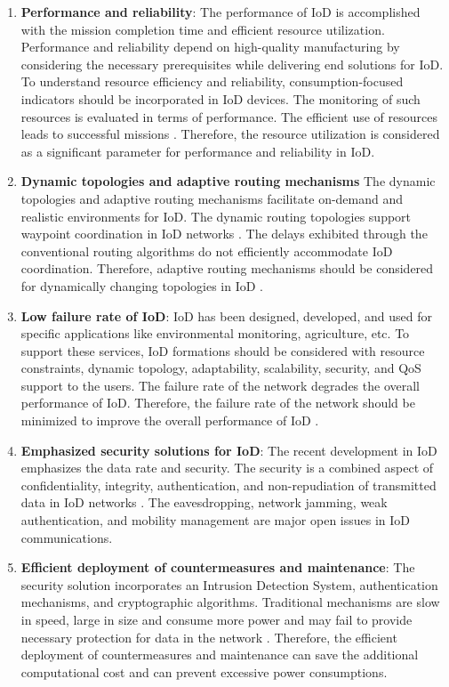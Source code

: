 \documentclass{easychair}
\begin{document}
\begin{enumerate}
\item  \textbf{Performance and reliability}: The performance of IoD is accomplished with the mission completion time and efficient resource utilization.  Performance and reliability depend on high-quality manufacturing by considering the necessary prerequisites while delivering end solutions for IoD. To understand resource efficiency and reliability, consumption-focused indicators should be incorporated in IoD devices. The monitoring of such resources is evaluated in terms of performance. The efficient use of resources leads to successful missions \cite{li2017optimal}. Therefore, the resource utilization is considered as a significant parameter for performance and reliability in IoD.

\item  \textbf{Dynamic topologies and adaptive routing mechanisms} The dynamic topologies and adaptive routing mechanisms facilitate on-demand and realistic environments for IoD. The dynamic routing topologies support waypoint coordination in IoD networks \cite{sharma2018offrp}. The delays exhibited through the conventional routing algorithms do not efficiently accommodate IoD coordination. Therefore, adaptive routing mechanisms should be considered for dynamically changing topologies in IoD \cite{wu2018joint}.

\item  \textbf{Low failure rate of IoD}: IoD has been designed, developed, and used for specific applications like environmental monitoring, agriculture, etc. To support these services, IoD formations should be considered with resource constraints, dynamic topology, adaptability, scalability, security, and QoS support to the users. The failure rate of the network degrades the overall performance of IoD. Therefore, the failure rate of the network should be minimized to improve the overall performance of IoD \cite{sharma2015self}.

 \item  \textbf{Emphasized security solutions for IoD}: The recent development in IoD emphasizes the data rate and security. The security is a combined aspect of confidentiality, integrity, authentication, and non-repudiation of transmitted data in IoD networks \cite{haque2018new}. The eavesdropping, network jamming, weak authentication, and mobility management are major open issues in IoD communications.

\item  \textbf{Efficient deployment of countermeasures and maintenance}: The security solution incorporates an Intrusion Detection System, authentication mechanisms, and cryptographic algorithms. Traditional mechanisms are slow in speed, large in size and consume more power and may fail to provide necessary protection for data in the network \cite{kamthan2017uavs}. Therefore, the efficient deployment of countermeasures and maintenance can save the additional computational cost and can prevent excessive power consumptions.


\end{enumerate}
\end{document}
